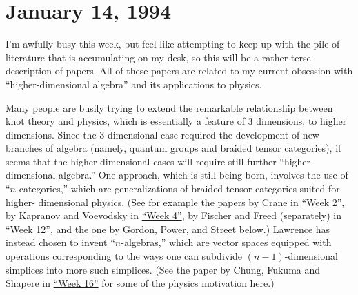 \documentclass{article}
\renewcommand{\texttt}[1]{%
  \begingroup
  \ttfamily
  \begingroup\lccode`~=`/\lowercase{\endgroup\def~}{/\discretionary{}{}{}}%
  \begingroup\lccode`~=`[\lowercase{\endgroup\def~}{[\discretionary{}{}{}}%
  \begingroup\lccode`~=`.\lowercase{\endgroup\def~}{.\discretionary{}{}{}}%
  \catcode`/=\active\catcode`[=\active\catcode`.=\active
  \scantokens{#1\noexpand}%
  \endgroup
}
\begin{document}
\hypertarget{week29}{%
\section{January 14, 1994}\label{week29}}

I'm awfully busy this week, but feel like attempting to keep up with the
pile of literature that is accumulating on my desk, so this will be a
rather terse description of papers. All of these papers are related to
my current obsession with ``higher-dimensional algebra'' and its
applications to physics.


Many people are busily trying to extend the remarkable relationship
between knot theory and physics, which is essentially a feature of 3
dimensions, to higher dimensions. Since the \(3\)-dimensional case
required the development of new branches of algebra (namely, quantum
groups and braided tensor categories), it seems that the
higher-dimensional cases will require still further ``higher-dimensional
algebra.'' One approach, which is still being born, involves the use of
``\(n\)-categories,'' which are generalizations of braided tensor
categories suited for higher- dimensional physics. (See for example the
papers by Crane in \protect\hyperlink{week2}{``Week 2''}, by Kapranov
and Voevodsky in \protect\hyperlink{week4}{``Week 4''}, by Fischer and
Freed (separately) in \protect\hyperlink{week12}{``Week 12''}, and the
one by Gordon, Power, and Street below.) Lawrence has instead chosen to
invent ``\(n\)-algebras,'' which are vector spaces equipped with
operations corresponding to the ways one can subdivide
\((n-1)\)-dimensional simplices into more such simplices. (See the paper
by Chung, Fukuma and Shapere in \protect\hyperlink{week16}{``Week 16''}
for some of the physics motivation here.)
\end{document}
